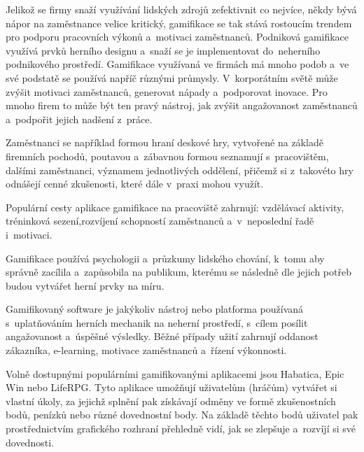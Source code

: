 \documentclass[12pt]{article}
\begin{document}
Jelikož se firmy snaží využívání lidských zdrojů zefektivnit co nejvíce, 
někdy bývá nápor na zaměstnance velice kritický,
gamifikace se tak stává rostoucím trendem pro podporu pracovních výkonů
a~motivaci zaměstnanců.
Podniková gamifikace využívá prvků herního designu a~snaží se
je implementovat do~neherního podnikového prostředí. 
Gamifikace využívaná ve firmách
má mnoho podob a~ve své podstatě se používá napříč různými průmysly. 
V~korporátním světě může zvýšit motivaci zaměstnanců, generovat nápady a~podporovat inovace. 
Pro mnoho firem to může být ten pravý nástroj, jak zvýšit angažovanost zaměstnanců
a~podpořit jejich nadšení z~práce. 

\par 
Zaměstnanci se například formou hraní deskové hry, vytvořené na základě firemních pochodů,
poutavou a~zábavnou formou seznamují s~pracovištěm, dalšími zaměstnanci, 
významem jednotlivých oddělení,
přičemž si z~takovéto hry odnášejí cenné zkušenosti, které dále v~praxi mohou využít.

\par

Populární cesty aplikace gamifikace na pracoviště zahrnují: vzdělávací aktivity,
tréninková sezení,rozvíjení schopností zaměstnanců a~v~neposlední řadě i~motivaci.

Gamifikace používá psychologii a~průzkumy lidského chování, k~tomu aby správně zacílila a~zapůsobila na publikum,
kterému se následně dle jejich potřeb budou vytvářet herní prvky na míru.


Gamifikovaný software je jakýkoliv nástroj nebo platforma používaná s~uplatňováním herních mechanik na neherní prostředí,
s~cílem posílit angažovanost a~úspěšné výsledky.
Běžné případy užití zahrnují oddanost zákazníka, e-learning, motivace zaměstnanců a~řízení výkonnosti. 

\par

Volně dostupnými populárními gamifikovanými aplikacemi jsou Habatica, Epic Win nebo LifeRPG. 
Tyto aplikace umožňují uživatelům (hráčům) vytvářet si vlastní úkoly, 
za jejichž splnění pak získávají odměny ve formě zkušenostních bodů,
penízků nebo různé dovednostní body. 
Na základě těchto bodů uživatel pak prostřednictvím grafického rozhraní přehledně vidí,
jak se zlepšuje a~rozvíjí si své dovednosti. 

\par
\end{document}
